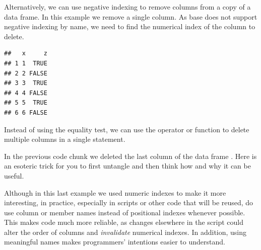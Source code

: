 \documentclass[krantz2]{krantz}\usepackage{knitr}
\begin{document}
\begin{explainbox}
Alternatively, we can use negative indexing to remove columns from a copy of a data frame. In this example we remove a single column. As base \Rlang does not support negative indexing by name, we need to find the numerical index of the column to delete.

\begin{knitrout}\footnotesize
{}\color{fgcolor}\begin{kframe}
\begin{alltt}
\hlstd{a.df[ ,} \hlopt{-}\hlstd{(} \hlopt{==} \hlstd{)]}
\end{alltt}
\begin{verbatim}
##   x     z
## 1 1  TRUE
## 2 2 FALSE
## 3 3  TRUE
## 4 4 FALSE
## 5 5  TRUE
## 6 6 FALSE
\end{verbatim}
\end{kframe}
\end{knitrout}
Instead of using the equality test, we can use the operator  or function  to delete multiple columns in a single statement.
\end{explainbox}

\begin{playground}
In the previous code chunk we deleted the last column of the data frame .
Here is an esoteric trick for you to first untangle and then think how and why it can be useful.

\begin{knitrout}\footnotesize
{}\color{fgcolor}\begin{kframe}
\begin{alltt}
\hlstd{a.df[}\hlopt{:}\hlstd{,} \hlstd{(}\hlstd{,}\hlstd{)]} \hlkwb{<-} \hlstd{a.df[}\hlopt{:}\hlstd{,} \hlstd{(}\hlstd{,}\hlstd{)]}
\end{alltt}
\end{kframe}
\end{knitrout}
\end{playground}

\begin{warningbox}
Although in this last example we used numeric indexes to make it more interesting, in practice, especially in scripts or other code that will be reused, do use column or member names instead of positional indexes whenever possible. This makes code much more reliable, as changes elsewhere in the script could alter the order of columns and \emph{invalidate} numerical indexes. In addition, using meaningful names makes programmers' intentions easier to understand.
\end{warningbox}
\end{document}
